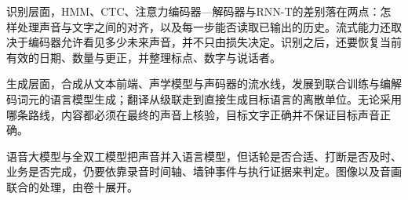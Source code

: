 识别层面，HMM、CTC、注意力编码器—解码器与RNN-T的差别落在两点：怎样处理声音与文字之间的对齐，以及每一步能否读取已输出的历史。流式能力还取决于编码器允许看见多少未来声音，并不只由损失决定。识别之后，还要恢复当前有效的日期、数量与更正，并整理标点、数字与说话者。

生成层面，合成从文本前端、声学模型与声码器的流水线，发展到联合训练与编解码词元的语言模型生成；翻译从级联走到直接生成目标语言的离散单位。无论采用哪条路线，内容都必须在最终的声音上核验，目标文字正确并不保证目标声音正确。

语音大模型与全双工模型把声音并入语言模型，但话轮是否合适、打断是否及时、业务是否完成，仍要依靠录音时间轴、墙钟事件与执行证据来判定。图像以及音画联合的处理，由卷十展开。
